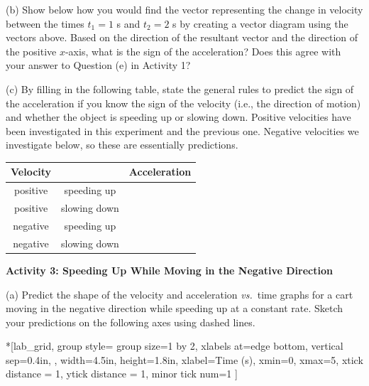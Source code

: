(b) Show below how you would find the vector representing the change in velocity
between the times $t_1 = 1$ s and $t_2 = 2$ s by creating a vector diagram using the vectors above. Based on the direction of the resultant vector and the direction of the positive $x$-axis, what is the sign of the acceleration? Does this agree with your answer to Question (e) in Activity 1?
\answerspace{25mm}

(c) By filling in the following table, state the general rules to predict the 
sign of the acceleration if you know the sign of the velocity (i.e., the 
direction of motion) and whether the object is speeding up or slowing down. 
Positive velocities have been investigated in this experiment and the previous 
one. Negative velocities we investigate below, so these are essentially 
predictions.

\vspace{0.3cm}
{\centering \begin{tabular}{|c|c|c|}
\hline
Velocity&
&
Acceleration\\
\hline
positive&
speeding up&
\\
\hline
positive&
slowing down&
\\
\hline
negative&
speeding up&
\\
\hline
negative&
slowing down&
\\
\hline
\end{tabular}\par}
\vspace{0.3cm}


\pagebreak[2]
\textbf{Activity 3: Speeding Up While Moving in the Negative Direction} 

(a) Predict the shape of the velocity and acceleration \textit{vs.}~time graphs
for a cart moving in the negative direction while speeding up at a constant rate. Sketch your predictions on the following axes using dashed lines.

\begin{lab_groupplot}*{}[lab_grid,
	group style={
		group size=1 by 2,
		xlabels at=edge bottom,
		vertical sep=0.4in,
		},
	width=4.5in,  height=1.8in,
	xlabel=Time (s),
	xmin=0, xmax=5,
	xtick distance = 1, 
	ytick distance = 1, 
	minor tick num=1
	]
\nextgroupplot[
	ymin=-1,ymax=1, 
	ylabel={Velocity (m/s)},
	]
\nextgroupplot[
	ymin=-1,ymax=1, 
	ylabel={Acceleration (m/s$^2$)},
	]
\end{lab_groupplot}

